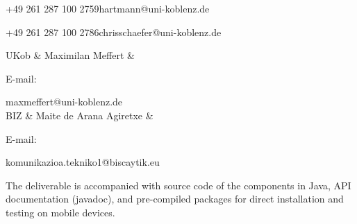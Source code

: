 \documentclass[external]{20120615_deliverable_template_ukob}
\theoremstyle{definition}
\begin{document}
\begin{LGhistory}

\end{LGhistory}


\newcommand{\LGaddauthorNoPhone}[3]{\hline  #1 &  #2 & %
   \parbox{3em}{E-mail:} \small #3 \\
}

\begin{LGauthors}

%
{+49 261 287 100 2759}{\small hartmann@uni-koblenz.de}

%
{+49 261 287 100 2786}{\small chrisschaefer@uni-koblenz.de}

\LGaddauthorNoPhone{UKob}{Maximilan Meffert}%
{\small maxmeffert@uni-koblenz.de}

\LGaddauthorNoPhone{BIZ}{Maite de Arana Agiretxe}%
{\small komunikazioa.tekniko1@biscaytik.eu}



\end{LGauthors}



\begin{LGExecutiveSummary}
  \vspace{10pt}

  The deliverable is accompanied with source code of the components in
  Java, API documentation (javadoc), and pre-compiled packages for
  direct installation and testing on mobile devices.

\end{LGExecutiveSummary}
\end{document}
